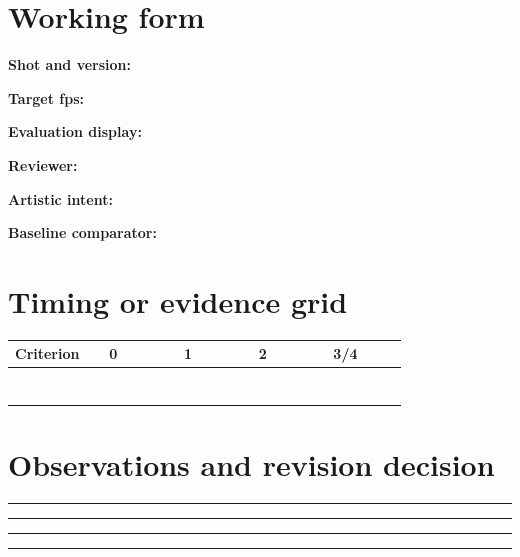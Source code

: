 \documentclass[10pt,letterpaper]{article}
\begin{document}
\section{Working form}
\noindent\textbf{Shot and version:}\quad\hrulefill\par\vspace{10pt}
\noindent\textbf{Target fps:}\quad\hrulefill\par\vspace{10pt}
\noindent\textbf{Evaluation display:}\quad\hrulefill\par\vspace{10pt}
\noindent\textbf{Reviewer:}\quad\hrulefill\par\vspace{10pt}
\noindent\textbf{Artistic intent:}\quad\hrulefill\par\vspace{10pt}
\noindent\textbf{Baseline comparator:}\quad\hrulefill\par\vspace{10pt}\section{Timing or evidence grid}
\begin{longtable}{|p{0.156\linewidth}|p{0.156\linewidth}|p{0.156\linewidth}|p{0.156\linewidth}|p{0.156\linewidth}|}
\hline
\textbf{Criterion} & \textbf{0} & \textbf{1} & \textbf{2} & \textbf{3/4}\\\hline
\endhead
\rule{0pt}{20pt} &  &  &  & \\\hline
\rule{0pt}{20pt} &  &  &  & \\\hline
\rule{0pt}{20pt} &  &  &  & \\\hline
\rule{0pt}{20pt} &  &  &  & \\\hline
\rule{0pt}{20pt} &  &  &  & \\\hline
\rule{0pt}{20pt} &  &  &  & \\\hline
\rule{0pt}{20pt} &  &  &  & \\\hline
\end{longtable}
\section{Observations and revision decision}
\noindent\rule{\linewidth}{0.4pt}\par\vspace{18pt}\noindent\rule{\linewidth}{0.4pt}\par\vspace{18pt}\noindent\rule{\linewidth}{0.4pt}\par\vspace{18pt}\noindent\rule{\linewidth}{0.4pt}\par\vspace{18pt}
\end{document}

